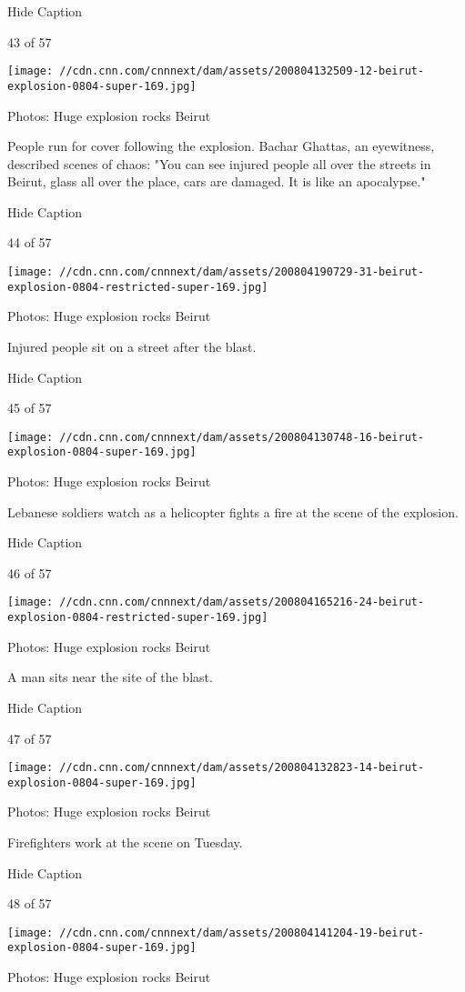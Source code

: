 Hide Caption

43 of 57

\texttt{[image: //cdn.cnn.com/cnnnext/dam/assets/200804132509-12-beirut-explosion-0804-super-169.jpg]}

Photos: Huge explosion rocks Beirut

People run for cover following the explosion. Bachar Ghattas, an
eyewitness, described scenes of chaos: "You can see injured people all
over the streets in Beirut, glass all over the place, cars are damaged.
It is like an apocalypse."

Hide Caption

44 of 57

\texttt{[image: //cdn.cnn.com/cnnnext/dam/assets/200804190729-31-beirut-explosion-0804-restricted-super-169.jpg]}

Photos: Huge explosion rocks Beirut

Injured people sit on a street after the blast.

Hide Caption

45 of 57

\texttt{[image: //cdn.cnn.com/cnnnext/dam/assets/200804130748-16-beirut-explosion-0804-super-169.jpg]}

Photos: Huge explosion rocks Beirut

Lebanese soldiers watch as a helicopter fights a fire at the scene of
the explosion.

Hide Caption

46 of 57

\texttt{[image: //cdn.cnn.com/cnnnext/dam/assets/200804165216-24-beirut-explosion-0804-restricted-super-169.jpg]}

Photos: Huge explosion rocks Beirut

A man sits near the site of the blast.

Hide Caption

47 of 57

\texttt{[image: //cdn.cnn.com/cnnnext/dam/assets/200804132823-14-beirut-explosion-0804-super-169.jpg]}

Photos: Huge explosion rocks Beirut

Firefighters work at the scene on Tuesday.

Hide Caption

48 of 57

\texttt{[image: //cdn.cnn.com/cnnnext/dam/assets/200804141204-19-beirut-explosion-0804-super-169.jpg]}

Photos: Huge explosion rocks Beirut

